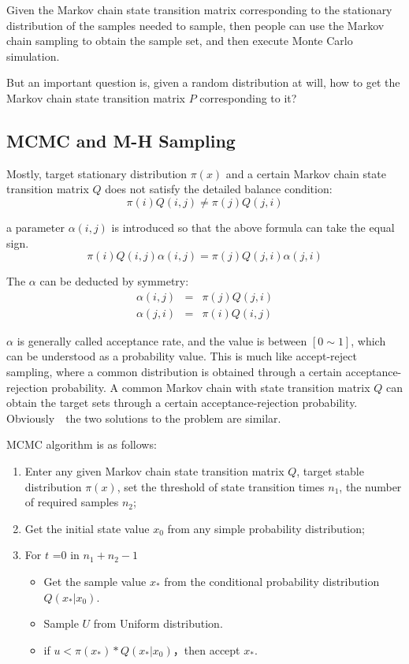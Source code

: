 Given the Markov chain state transition matrix corresponding to the stationary distribution of the samples needed to sample, then people can use the Markov chain sampling to obtain the sample set, and then execute Monte Carlo simulation.

But an important question is, given a random distribution at will, how to get the Markov chain state transition matrix $P$ corresponding to it?

\subsection{MCMC  and M-H Sampling}
Mostly, target stationary distribution $\pi(x)$ and a certain Markov chain state transition matrix $Q$ does not satisfy the detailed balance condition:
\[
  \pi(i)Q(i,j) \neq \pi(j)Q(j,i)
\]


a parameter $\alpha(i,j)$ is introduced so that the above formula can take the equal sign.
\[
  \pi(i)Q(i,j)\alpha(i,j) = \pi(j)Q(j,i)\alpha(j,i)
\]

The $\alpha$ can be deducted by symmetry:
\begin{eqnarray*}
\alpha(i,j) &=& \pi(j)Q(j,i)\\
\alpha(j,i) &=& \pi(i)Q(i,j)
\end{eqnarray*}


$\alpha$ is generally called acceptance rate, and the value is between $[0 \sim 1]$, which can be understood as a probability value. This is much like accept-reject sampling, where a common distribution is obtained through a certain acceptance-rejection probability. A common Markov chain with state transition matrix $Q$  can obtain the target sets through a certain acceptance-rejection probability. Obviously　the two solutions to the problem are similar\cite{mh}.

MCMC  algorithm is as follows:
\begin{enumerate}
  \item Enter any given Markov chain state transition matrix $Q$, target stable distribution $\pi(x)$, set the threshold of state transition times $n_1$, the number of required samples $n_2$;
  \item Get the initial state value $x_0$ from any simple probability distribution;
  \item For $t$ =0 in $n_1+n_2-1$
    \begin{itemize}
      \item Get the sample value $x_*$ from the conditional probability distribution $Q(x_*|x_0)$.
      \item Sample $U$ from Uniform distribution.
      \item if $u<\pi(x_*)*Q(x_*|x_0)$，then accept $x_*$.
    \end{itemize}
\end{enumerate}


